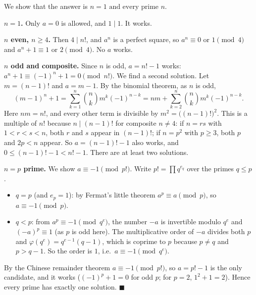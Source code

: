 We show that the answer is $\boxed{n=1\text{ and every prime }n}$.

\textbf{$n=1$.} Only $a=0$ is allowed, and $1\mid1$. It works.

\textbf{$n$ even, $n\ge4$.} Then $4\mid n!$, and $a^n$ is a perfect square, so $a^n\equiv0$ or $1\pmod4$ and $a^n+1\equiv1$ or $2\pmod 4$. No $a$ works.

\textbf{$n$ odd and composite.} Since $n$ is odd, $a=n!-1$ works: $a^n+1\equiv(-1)^n+1=0\pmod{n!}$. We find a second solution. Let $m=(n-1)!$ and $a=m-1$. By the binomial theorem, as $n$ is odd,
\[
(m-1)^n+1=\sum_{k=1}^{n}\binom nk m^k(-1)^{n-k}=nm+\sum_{k=2}^{n}\binom nk m^k(-1)^{n-k}.
\]
Here $nm=n!$, and every other term is divisible by $m^2=\bigl((n-1)!\bigr)^2$. This is a multiple of $n!$ because $n\mid(n-1)!$ for composite $n\ne4$: if $n=rs$ with $1<r<s<n$, both $r$ and $s$ appear in $(n-1)!$; if $n=p^2$ with $p\ge3$, both $p$ and $2p<n$ appear. So $a=(n-1)!-1$ also works, and $0\le(n-1)!-1<n!-1$. There are at least two solutions.

\textbf{$n=p$ prime.} We show $a\equiv-1\pmod{p!}$. Write $p!=\prod q^{e_q}$ over the primes $q\le p$.
\begin{itemize}
\item $q=p$ (and $e_p=1$): by Fermat's little theorem $a^p\equiv a\pmod p$, so $a\equiv-1\pmod p$.
\item $q<p$: from $a^p\equiv-1\pmod{q^{e}}$, the number $-a$ is invertible modulo $q^e$ and $(-a)^p\equiv1$ (as $p$ is odd here). The multiplicative order of $-a$ divides both $p$ and $\varphi(q^e)=q^{e-1}(q-1)$, which is coprime to $p$ because $p\ne q$ and $p>q-1$. So the order is $1$, i.e.\ $a\equiv-1\pmod{q^e}$.
\end{itemize}
By the Chinese remainder theorem $a\equiv-1\pmod{p!}$, so $a=p!-1$ is the only candidate, and it works ($(-1)^p+1=0$ for odd $p$; for $p=2$, $1^2+1=2$). Hence every prime has exactly one solution. $\blacksquare$
